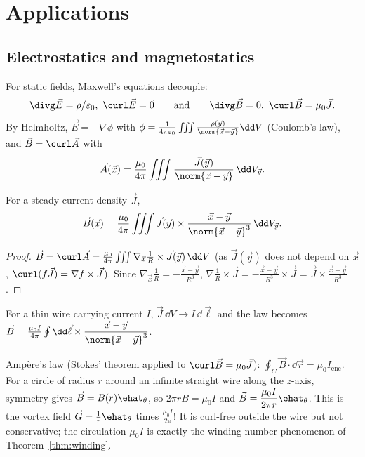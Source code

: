 \section{Applications}

\subsection{Electrostatics and magnetostatics}

For static fields, Maxwell's equations decouple:
\[
\divg\vec E=\rho/\varepsilon_0,\ \curl\vec E=\vec0\qquad\text{and}\qquad\divg\vec B=0,\ \curl\vec B=\mu_0\vec J .
\]
By Helmholtz, $\vec E=-\nabla\phi$ with $\phi=\frac1{4\pi\varepsilon_0}\iiint\frac{\rho(\vec y)}{\norm{\vec x-\vec y}}\dd V$ (Coulomb's law), and $\vec B=\curl\vec A$ with
\[
\vec A(\vec x)=\frac{\mu_0}{4\pi}\iiint\frac{\vec J(\vec y)}{\norm{\vec x-\vec y}}\,\dd V_{\vec y}.
\]

\begin{theorem}\label{thm:biotsavart}
For a steady current density $\vec J$,
\[
\vec B(\vec x)=\frac{\mu_0}{4\pi}\iiint\vec J(\vec y)\times\frac{\vec x-\vec y}{\norm{\vec x-\vec y}^3}\,\dd V_{\vec y}.
\]
\end{theorem}

\begin{proof}
$\vec B=\curl\vec A=\frac{\mu_0}{4\pi}\iiint\nabla_{\vec x}\frac1R\times\vec J(\vec y)\,\dd V$ (as $\vec J(\vec y)$ does not depend on $\vec x$, $\curl(f\vec J)=\nabla f\times\vec J$). Since $\nabla_{\vec x}\frac1R=-\frac{\vec x-\vec y}{R^3}$, $\nabla\frac1R\times\vec J=-\frac{\vec x-\vec y}{R^3}\times\vec J=\vec J\times\frac{\vec x-\vec y}{R^3}$.
\end{proof}

For a thin wire carrying current $I$, $\vec J\,\dd V\to I\,\dd\vec\ell$ and the law becomes $\vec B=\frac{\mu_0I}{4\pi}\oint\dd\vec\ell\times\dfrac{\vec x-\vec y}{\norm{\vec x-\vec y}^3}$.

\begin{example}
Amp\`ere's law (Stokes' theorem applied to $\curl\vec B=\mu_0\vec J$): $\oint_C\vec B\cdot\dd\vec r=\mu_0I_{\text{enc}}$. For a circle of radius $r$ around an infinite straight wire along the $z$-axis, symmetry gives $\vec B=B(r)\ehat_\theta$, so $2\pi rB=\mu_0I$ and $\vec B=\dfrac{\mu_0I}{2\pi r}\ehat_\theta$. This is the vortex field $\vec G=\frac1r\ehat_\theta$ times $\frac{\mu_0I}{2\pi}$! It is curl-free outside the wire but not conservative; the circulation $\mu_0I$ is exactly the winding-number phenomenon of Theorem~\ref{thm:winding}.
\end{example}

